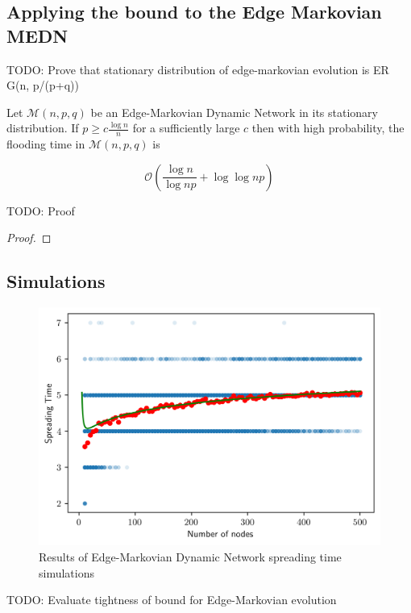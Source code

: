 \subsection{Applying the bound to the Edge Markovian MEDN}\label{subsect:floodingBoundEdgeMarkovian}

TODO: Prove that stationary distribution of edge-markovian evolution is ER G(n, p/(p+q))

\begin{theorem}
	Let $\mathcal{M}(n, p, q)$ be an Edge-Markovian Dynamic Network in its stationary distribution. If $p \geq c \frac{\log n}{n}$ for a sufficiently large $c$ then with high probability, the flooding time in $\mathcal{M}(n, p, q)$ is 

	$$
		\mathcal{O}\left(\frac{\log n}{\log np} + \log \log np \right)
	$$
\end{theorem}

TODO: Proof

\begin{proof}
	
\end{proof}


\subsection{Simulations}

\begin{figure}[h]
	\centering
	\includegraphics[width=1\textwidth]{./figures/flooding_gnp_simulation_results.png}
	\caption{Results of Edge-Markovian Dynamic Network spreading time simulations}
	\label{fig:floodingGnpSimResults}
\end{figure}

TODO: Evaluate tightness of bound for Edge-Markovian evolution